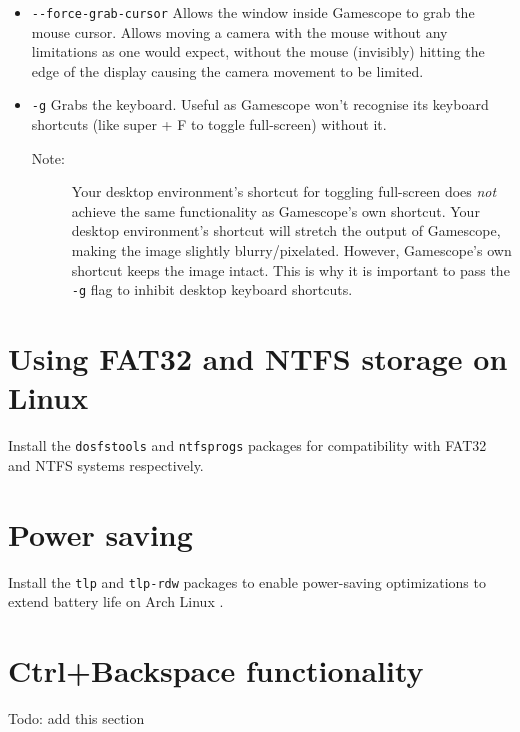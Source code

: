 \documentclass[a4paper]{article}
\begin{document}
\begin{itemize}
    \item \lstinline|--force-grab-cursor| Allows the window inside Gamescope to grab the mouse cursor. Allows moving a camera with the mouse without any limitations as one would expect, without the mouse (invisibly) hitting the edge of the display causing the camera movement to be limited.
    \item \lstinline|-g| Grabs the keyboard. Useful as Gamescope won't recognise its keyboard shortcuts (like super + F to toggle full-screen) without it.
    \begin{description}
        \item[Note:] Your desktop environment's shortcut for toggling full-screen does \emph{not} achieve the same functionality as Gamescope's own shortcut. Your desktop environment's shortcut will stretch the output of Gamescope, making the image slightly blurry/pixelated. However, Gamescope's own shortcut keeps the image intact. This is why it is important to pass the \lstinline|-g| flag to inhibit desktop keyboard shortcuts.
    \end{description}
\end{itemize}

\section{Using FAT32 and NTFS storage on Linux}

Install the \lstinline|dosfstools| and \lstinline|ntfsprogs| packages for compatibility with FAT32 and NTFS systems respectively.

\section{Power saving}

Install the \lstinline|tlp| and \lstinline|tlp-rdw| packages to enable power-saving optimizations to extend battery life on Arch Linux \cite{tlp-installation}.

\section{Ctrl+Backspace functionality}

Todo: add this section



\end{document}
